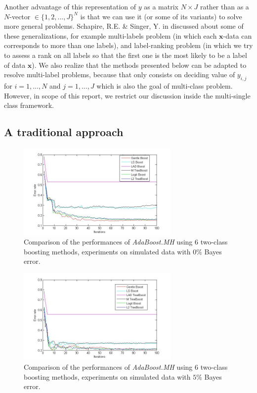 \documentclass[a4paper,twoside,12pt]{article}
\begin{document}
Another advantage of this representation of $y$ as a matrix $N\times J$ rather than as a $N$-vector $\in \{1,2,...,J\}^N$ is that we can use it (or some of its variants) to solve more general problems. Schapire, R.E. \& Singer, Y. in \cite{SchaAndSin1998} discussed about some of these generalizations, for example multi-labels problem (in which each $\textbf{x}$-data can corresponds to more than one labels), and label-ranking problem (in which we try to assess a rank on all labels so that the first one is the most likely to be a label of data $\textbf{x}$). We also realize that the methods presented below can be adapted to resolve multi-label problems, because that only consists on deciding value of $y_{i,j}$ for $i=1,...,N$ and $j=1,...,J$ which is also the goal of multi-class problem. However, in scope of this report, we restrict our discussion inside the multi-single class framework.

\subsection{A traditional approach}
\begin{figure}[ht]\centering
  	\includegraphics[width=0.7\textwidth]{comp_MH.jpg}
  	\caption{Comparison of the performances of \textsl{AdaBoost.MH} using $6$ two-class boosting methods, experiments on simulated data with $0 \%$ Bayes error.}
  	\label{comp_MH}
\end{figure}

\begin{figure}[ht]\centering
  	\includegraphics[width=0.7\textwidth]{comp_MH1.jpg}
  	\caption{Comparison of the performances of \textsl{AdaBoost.MH} using $6$ two-class boosting methods, experiments on simulated data with $5 \%$ Bayes error.}
  	\label{comp_MH1}
\end{figure}
\end{document}
